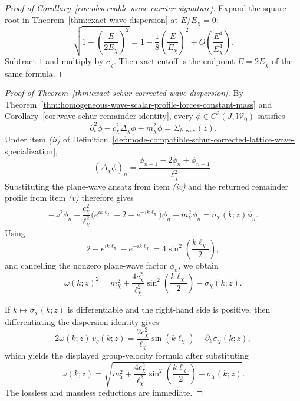 \begin{proof}[Proof of Corollary~\ref{cor:observable-wave-carrier-signature}]
\label{proof:cor:observable-wave-carrier-signature}
Expand the square root in Theorem~\ref{thm:exact-wave-dispersion} at
\(E/E_{\chi}=0\):
\[
\sqrt{1-\left(\frac{E}{2E_{\chi}}\right)^2}
=
1-\frac18\left(\frac{E}{E_{\chi}}\right)^2
+O\!\left(\frac{E^4}{E_{\chi}^4}\right).
\]
Subtract \(1\) and multiply by \(c_{\chi}\). The exact cutoff is the endpoint
\(E=2E_{\chi}\) of the same formula.
\end{proof}

\begin{proof}[Proof of Theorem~\ref{thm:exact-schur-corrected-wave-dispersion}]
\label{proof:thm:exact-schur-corrected-wave-dispersion}
By Theorem~\ref{thm:homogeneous-wave-scalar-profile-forces-constant-mass} and
Corollary~\ref{cor:wave-schur-remainder-identity}, every
\(\phi\in C^2(J,\mathcal W_0)\) satisfies
\[
\partial_t^2\phi
-
c_{\chi}^2\Delta_{\chi}\phi
+
m_{\chi}^2\phi
=
\Sigma_{h,\mathrm{wav}}(z).
\]
Under item \emph{(ii)} of
Definition~\ref{def:mode-compatible-schur-corrected-lattice-wave-specialization},
\[
(\Delta_{\chi}\phi)_n
=
\frac{\phi_{n+1}-2\phi_n+\phi_{n-1}}{\ell_{\chi}^2}.
\]
Substituting the plane-wave ansatz from item \emph{(iv)} and the returned
remainder profile from item \emph{(v)} therefore gives
\[
-\omega^2\phi_n
-
\frac{c_{\chi}^2}{\ell_{\chi}^2}
\bigl(e^{ik\ell_{\chi}}-2+e^{-ik\ell_{\chi}}\bigr)\phi_n
+
m_{\chi}^2\phi_n
=
\sigma_{\chi}(k;z)\phi_n.
\]
Using
\[
2-e^{ik\ell_{\chi}}-e^{-ik\ell_{\chi}}
=
4\sin^2\!\left(\frac{k\ell_{\chi}}{2}\right),
\]
and cancelling the nonzero plane-wave factor \(\phi_n\), we obtain
\[
\omega(k;z)^2
=
m_{\chi}^2
+
\frac{4c_{\chi}^2}{\ell_{\chi}^2}
\sin^2\!\left(\frac{k\ell_{\chi}}{2}\right)
-
\sigma_{\chi}(k;z).
\]

If \(k\mapsto \sigma_{\chi}(k;z)\) is differentiable and the right-hand side
is positive, then differentiating the dispersion identity gives
\[
2\omega(k;z)\,v_g(k;z)
=
\frac{2c_{\chi}^2}{\ell_{\chi}}\sin(k\ell_{\chi})
-
\partial_k\sigma_{\chi}(k;z),
\]
which yields the displayed group-velocity formula after substituting
\[
\omega(k;z)
=
\sqrt{
m_{\chi}^2
+
\frac{4c_{\chi}^2}{\ell_{\chi}^2}
\sin^2\!\left(\frac{k\ell_{\chi}}{2}\right)
-
\sigma_{\chi}(k;z)
}.
\]
The lossless and massless reductions are immediate.
\end{proof}

